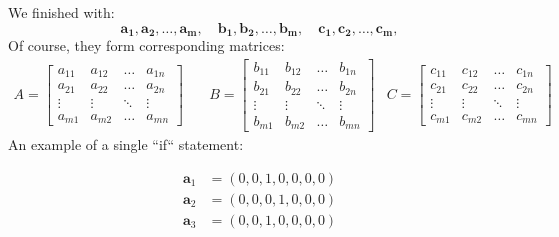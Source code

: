 \documentclass{zkdl-presentation-template}
\begin{document}
    \begin{frame}
        We finished with:
        \begin{equation*}
            \mathbf{a_1}, \mathbf{a_2}, \dots, \mathbf{a_m}, \quad
            \mathbf{b_1}, \mathbf{b_2}, \dots, \mathbf{b_m}, \quad
            \mathbf{c_1}, \mathbf{c_2}, \dots, \mathbf{c_m}, 
        \end{equation*}
        \pause
        Of course, they form corresponding matrices:
        {\scriptsize \begin{align*}
            A = \begin{bmatrix}
                a_{11} & a_{12} & \dots & a_{1n} \\
                a_{21} & a_{22} & \dots & a_{2n} \\
                \vdots & \vdots & \ddots & \vdots \\
                a_{m1} & a_{m2} & \dots & a_{mn}
            \end{bmatrix} & \quad
            B = \begin{bmatrix}
                b_{11} & b_{12} & \dots & b_{1n} \\
                b_{21} & b_{22} & \dots & b_{2n} \\
                \vdots & \vdots & \ddots & \vdots \\
                b_{m1} & b_{m2} & \dots & b_{mn}
            \end{bmatrix} & 
            C = \begin{bmatrix}
                c_{11} & c_{12} & \dots & c_{1n} \\
                c_{21} & c_{22} & \dots & c_{2n} \\
                \vdots & \vdots & \ddots & \vdots \\
                c_{m1} & c_{m2} & \dots & c_{mn}
            \end{bmatrix}
        \end{align*}}
        \pause
        An example of a single ``if`` statement:
        \begin{center}
        \begin{minipage}{0.4\textwidth}
        \vspace{-15pt}
        {\scriptsize \begin{align*}
            \mathbf{a}_1 &= (0, 0, 1, 0, 0, 0, 0) \\
            \mathbf{a}_2 &= (0, 0, 0, 1, 0, 0, 0) \\
            \mathbf{a}_3 &= (0, 0, 1, 0, 0, 0, 0) \\

\end{align*}}
\end{minipage}
\end{center}
\end{frame}
\end{document}
